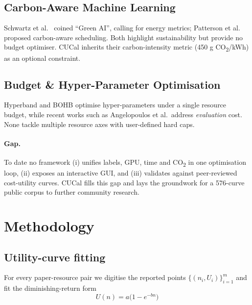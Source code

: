 \documentclass[11pt]{article}
\begin{document}
\subsection{Carbon-Aware Machine Learning}
Schwartz et al.~\citeyearpar{Schwartz2020} coined “Green AI”, calling for
energy metrics; Patterson et al.~\citeyearpar{Patterson2022} proposed
carbon-aware scheduling.  Both highlight sustainability but provide no
budget optimiser.  CUCal inherits their carbon-intensity metric
(450 g CO\textsubscript{2}/kWh) as an optional constraint.

\subsection{Budget \& Hyper-Parameter Optimisation}
Hyperband \citep{Li2017hyperband} and BOHB \citep{Falkner2018bohb}
optimise hyper-parameters under a single resource budget, while recent
works such as Angelopoulos et al.\ address \emph{evaluation} cost.
None tackle multiple resource axes with user-defined hard caps.

\paragraph{Gap.}
To date no framework (i) unifies labels, GPU, time and
CO\textsubscript{2} in one optimisation loop, (ii) exposes an interactive
GUI, and (iii) validates against peer-reviewed cost-utility curves.
CUCal fills this gap and lays the groundwork for a 576-curve public corpus
to further community research.

\section{Methodology}\label{sec:methodology}

\subsection{Utility-curve fitting}\label{sec:method:fit}
For every paper-resource pair we digitise the reported points
\(\{(n_i,U_i)\}_{i=1}^{m}\)%
\allowbreak and fit the diminishing-return form
\[
  U(n)=a\bigl(1-e^{-bn}\bigr)
\]
\end{document}
